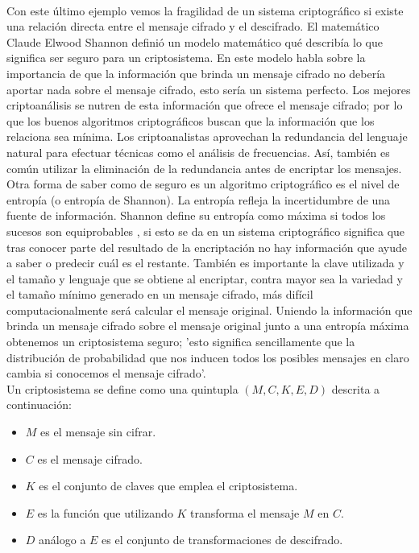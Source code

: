 \documentclass[../PFC.tex]{subfiles}
\begin{document}
\*
\vspace{0.5515cm}
\\
Con este último ejemplo vemos la fragilidad de un sistema criptográfico si existe una relación directa entre el mensaje cifrado y el descifrado. El matemático Claude Elwood Shannon definió un modelo matemático qué describía lo que significa ser seguro para un criptosistema\cite{bruce}. En este modelo habla sobre la importancia de que la información que brinda un mensaje cifrado no debería aportar nada sobre el mensaje cifrado, esto sería un sistema perfecto. Los mejores criptoanálisis se nutren de esta información que ofrece el mensaje cifrado; por lo que los buenos algoritmos criptográficos buscan que la información que los relaciona sea mínima. Los criptoanalistas aprovechan la redundancia del lenguaje natural para efectuar técnicas como el análisis de frecuencias. Así, también es común utilizar la eliminación de la redundancia antes de encriptar los mensajes.
\*
\vspace{0.5515cm}
\\
Otra forma de saber como de seguro es un algoritmo criptográfico es el nivel de entropía (o entropía de Shannon). La entropía refleja la incertidumbre de una fuente de información. Shannon define su entropía como máxima si todos los sucesos son equiprobables \cite{shannon2001mathematical}, si esto se da en un sistema criptográfico significa que tras conocer parte del resultado de la encriptación no hay información que ayude a saber o predecir cuál es el restante. También es importante la clave utilizada y el tamaño y lenguaje que se obtiene al encriptar, contra mayor sea la variedad y el tamaño mínimo generado en un mensaje cifrado, más difícil computacionalmente será calcular el mensaje original. Uniendo la información que brinda un mensaje cifrado sobre el mensaje original junto a una entropía máxima obtenemos un criptosistema seguro; 'esto significa sencillamente que la distribución de probabilidad que nos inducen todos los posibles mensajes en claro cambia si conocemos el mensaje cifrado'\cite{lucena}.
\*
\vspace{0.5515cm}
\\
Un criptosistema se define como una quintupla $(M,C,K,E,D)$ descrita a continuación\cite{lucena}:

\begin{itemize}
\item{$M$ es el mensaje sin cifrar.}
\item{$C$ es el mensaje cifrado.}
\item{$K$ es el conjunto de claves que emplea el criptosistema.}
\item{$E$ es la función que utilizando $K$ transforma el mensaje $M$ en $C$.}
\item{$D$ análogo a $E$ es el conjunto de transformaciones de descifrado.}
\end{itemize}
\end{document}
